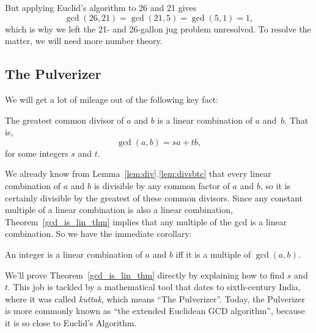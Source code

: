 But applying Euclid's algorithm to 26 and 21 gives
\[
\gcd(26, 21) = \gcd(21, 5) = \gcd(5, 1) = 1,
\]
which is why we left the 21- and 26-gallon jug problem unresolved.  To
resolve the matter, we will need more number theory.

\subsection{The Pulverizer}\label{sec:pulverizer}
We will get a lot of mileage out of the following key fact:
\begin{theorem}\label{gcd_is_lin_thm}
The greatest common divisor of $a$ and $b$ is a linear combination of
$a$ and~$b$.  That is,
\[
\gcd(a, b)  =  s a + t b,
\]
for some integers $s$ and $t$.
\end{theorem}

We already know from Lemma~\ref{lem:div}.\ref{lem:divsbtc} that every
linear combination of $a$ and $b$ is divisible by any common factor of
$a$ and $b$, so it is certainly divisible by the greatest of these
common divisors.  Since any constant multiple of a linear combination
is also a linear combination, Theorem~\ref{gcd_is_lin_thm} implies that
any multiple of the gcd is a linear combination.  So we have the
immediate corollary:
\begin{corollary}\label{cor:lin-comb}
An integer is a linear combination of $a$ and $b$ iff it is a multiple of
$\gcd(a, b)$.
\end{corollary}

We'll prove Theorem~\ref{gcd_is_lin_thm} directly by explaining how to
find $s$ and $t$.  This job is tackled by a mathematical tool that
dates to sixth-century India, where it was called \emph{kuttak}, which
means ``The Pulverizer''.  Today, the Pulverizer is more commonly
known as ``the extended Euclidean GCD algorithm'', because it is so
close to Euclid's Algorithm.

